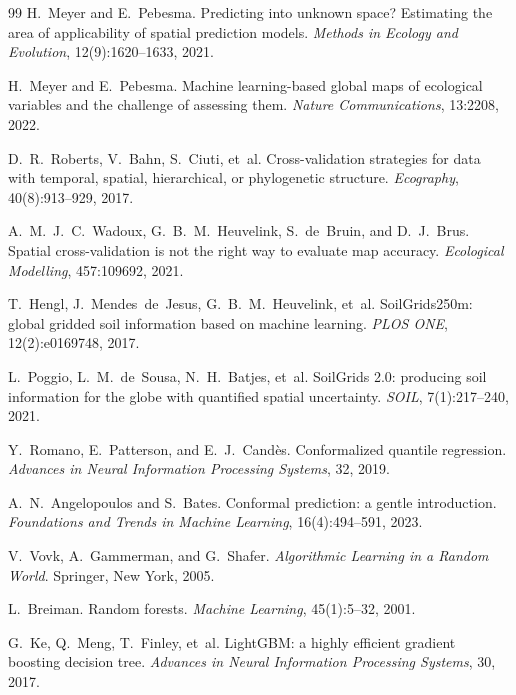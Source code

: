 \documentclass[twocolumn,9pt]{extarticle}
\begin{document}
\begin{thebibliography}{99}
H.~Meyer and E.~Pebesma.
\newblock Predicting into unknown space? Estimating the area of applicability of spatial prediction models.
\newblock \emph{Methods in Ecology and Evolution}, 12(9):1620--1633, 2021.

H.~Meyer and E.~Pebesma.
\newblock Machine learning-based global maps of ecological variables and the challenge of assessing them.
\newblock \emph{Nature Communications}, 13:2208, 2022.

D.~R.~Roberts, V.~Bahn, S.~Ciuti, et~al.
\newblock Cross-validation strategies for data with temporal, spatial, hierarchical, or phylogenetic structure.
\newblock \emph{Ecography}, 40(8):913--929, 2017.

A.~M.~J.~C.~Wadoux, G.~B.~M.~Heuvelink, S.~de~Bruin, and D.~J.~Brus.
\newblock Spatial cross-validation is not the right way to evaluate map accuracy.
\newblock \emph{Ecological Modelling}, 457:109692, 2021.

T.~Hengl, J.~Mendes~de~Jesus, G.~B.~M.~Heuvelink, et~al.
\newblock SoilGrids250m: global gridded soil information based on machine learning.
\newblock \emph{PLOS ONE}, 12(2):e0169748, 2017.

L.~Poggio, L.~M.~de~Sousa, N.~H.~Batjes, et~al.
\newblock SoilGrids 2.0: producing soil information for the globe with quantified spatial uncertainty.
\newblock \emph{SOIL}, 7(1):217--240, 2021.

Y.~Romano, E.~Patterson, and E.~J.~Cand\`es.
\newblock Conformalized quantile regression.
\newblock \emph{Advances in Neural Information Processing Systems}, 32, 2019.

A.~N.~Angelopoulos and S.~Bates.
\newblock Conformal prediction: a gentle introduction.
\newblock \emph{Foundations and Trends in Machine Learning}, 16(4):494--591, 2023.

V.~Vovk, A.~Gammerman, and G.~Shafer.
\newblock \emph{Algorithmic Learning in a Random World}.
\newblock Springer, New York, 2005.

L.~Breiman.
\newblock Random forests.
\newblock \emph{Machine Learning}, 45(1):5--32, 2001.

G.~Ke, Q.~Meng, T.~Finley, et~al.
\newblock LightGBM: a highly efficient gradient boosting decision tree.
\newblock \emph{Advances in Neural Information Processing Systems}, 30, 2017.


\end{thebibliography}
\end{document}
